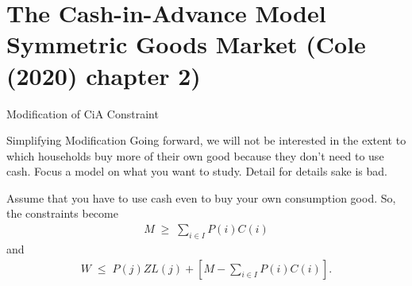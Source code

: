 \documentclass[10pt,c,aspectratio=1610,handout]{beamer}
\begin{document}
\section{The Cash-in-Advance Model\\\small{Symmetric Goods Market (Cole (2020) chapter 2)}}
\begin{frame}{Modification of CiA Constraint}%
  \begin{block}{Simplifying Modification}%
    \small%
    Going forward, we will not be interested in the extent to which households buy more of their own good because they don't need to use cash. Focus a model on what you want to study. Detail for details sake is bad.%
  \end{block}%
  \pause%
  Assume that you have to use cash even to buy your own consumption good. So, the constraints become%
  \begin{align*}%
    M \; \geq \; \sum_{i\in I}P(i)C(i)%
  \end{align*}%
  and%
  \begin{align*}%
    W \; \leq \; P(j)ZL(j)+\left[ M-\sum_{i\in I}P(i)C(i)\right] .%
  \end{align*}%
\end{frame}%
\end{document}
